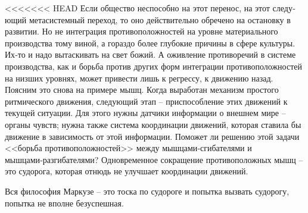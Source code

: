 \documentclass{book}
\begin{document}
{<<<<<<< HEAD
Если общество неспособно на этот перенос, на этот следу­ющий метасистемный переход, то оно действительно обречено на остановку в развитии. Но не интеграция противоположно­стей на уровне материального производства тому виной, а гораз­до более глубокие причины в сфере культуры. Их‑то и надо вытаскивать на свет божий. А оживление противоречий в систе­ме производства, как и борьба против других форм интегра­ции противоположностей на низших уровнях, может привести лишь к регрессу, к движению назад. Поясним это снова на при­мере мышц. Когда выработан механизм простого ритмического движения, следующий этап -- приспособление этих движений к текущей ситуации. Для этого нужны датчики информации о внешнем мире -- органы чувств; нужна также система коор­динации движений, которая ставила бы движение в зависи­мость от этой информации. Поможет ли решению этой задачи <<борьба противоположностей>> между мышцами‑сгибателями и мышцами‑разгибателями? Одновременное сокращение проти­воположных мышц -- это судорога, которая отнюдь не улучшает координации движений.

Вся философия Маркузе -- это тоска по судороге и попытка вызвать судорогу, попытка не вполне безуспешная.

}
\end{document}
